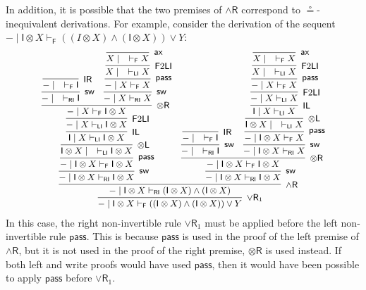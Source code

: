 \documentclass[submission,copyright,creativecommons]{eptcs}
\theoremstyle{definition}
\newcommand{\tl}{\otimes \mathsf{L}}
\newcommand{\tr}{\otimes \mathsf{R}}
\newcommand{\pass}{\mathsf{pass}}
\newcommand{\unitl}{\mathsf{IL}}
\newcommand{\unitr}{\mathsf{IR}}
\newcommand{\andr}{\land \mathsf{R}}
\newcommand{\orrone}{\lor \mathsf{R}_{1}}
\newcommand{\ax}{\mathsf{ax}}
\newcommand{\ot}{\otimes}
\newcommand{\I}{\mathsf{I}}
\newcommand{\RI}{\mathsf{RI}}
\newcommand{\LI}{\mathsf{LI}}
\newcommand{\F}{\mathsf{F}}
\newcommand{\sw}{\mathsf{sw}}
\newcommand\niccolo[1]{\mbox{}
{\marginpar{\color{red}NV}}
{\sf\noindent\color{red}#1}}%
\begin{document}
In addition, it is possible that the two premises of $\andr$ correspond to $\circeq$-inequivalent derivations.
For example, consider the derivation of the sequent $- \mid \I \ot X \vdash_\F ((I \ot X) \land (\I \ot X)) \lor Y$: %
\begin{equation*}\small
  \begin{array}{c}
    \infer[\orrone]{- \mid \I \ot X \vdash_\F ((\I \ot X) \land (\I \ot X)) \lor Y}{
      \infer[\andr]{- \mid \I \ot X \vdash_\RI (\I \ot X) \land (\I \ot X)}{
        \infer[\sw]{- \mid \I \ot X \vdash_\RI \I \ot X}{
        \infer[\pass]{- \mid \I \ot X \vdash_\F \I \ot X}{
          \infer[\tl]{\I \ot X \mid \quad \vdash_\LI \I \ot X}{
          \infer[\unitl]{\I \mid X \vdash_\LI \I \ot X}{
            \infer[\F 2 \LI]{- \mid X \vdash_\LI \I \ot X}{
            \infer[\tr]{- \mid X \vdash_\F \I \ot X}{
                \infer[\sw]{- \mid \quad \vdash_\RI \I}{
                \infer[\unitr]{- \mid \quad \vdash_\F \I}{}
              }
              &
              \infer[\sw]{- \mid X \vdash_\RI X}{
              \infer[\pass]{- \mid X \vdash_\F X}{
                \infer[\F 2 \LI]{X \mid \quad \vdash_\LI X}{
                \infer[\ax]{X \mid \quad \vdash_\F X}{}
              }
            }
          }
        }
        }}}}}
        &
        \infer[\sw]{- \mid \I \ot X \vdash_\RI \I \ot X}{
        \infer[\tr]{- \mid \I \ot X \vdash_\F \I \ot X}{
          \infer[\sw]{- \mid \quad \vdash_\RI \I}{
            \infer[\unitr]{- \mid \quad \vdash_\F \I}{}
            }
          &
          \infer[\sw]{- \mid \I \ot X \vdash_\RI X}{
          \infer[\pass]{- \mid \I \ot X \vdash_\F X}{
            \infer[\tl]{\I \ot X \mid \quad \vdash_\LI X}{
              \infer[\unitl]{\I \mid X \vdash_\LI X}{
                \infer[\F 2 \LI]{- \mid X \vdash_\LI X}{
                \infer[\pass]{- \mid X \vdash_\F X}{
                  \infer[\F 2 \LI]{X \mid \quad \vdash_\LI X}{
                  \infer[\ax]{X \mid \quad \vdash_\F X}{}
                }
              }
            }
          }
        }
      }
    }}}}}
  \end{array}
\end{equation*}
In this case, %
the right non-invertible rule $\orrone$ must be applied before the left non-invertible rule $\pass$. This is because $\pass$ is used in the proof of the left premise of $\andr$, but it is not used in the proof of the right premise, $\tr$ is used instead. If both left and write proofs would have used $\pass$, then it would have been possible to apply $\pass$ before $\orrone$.
\end{document}
